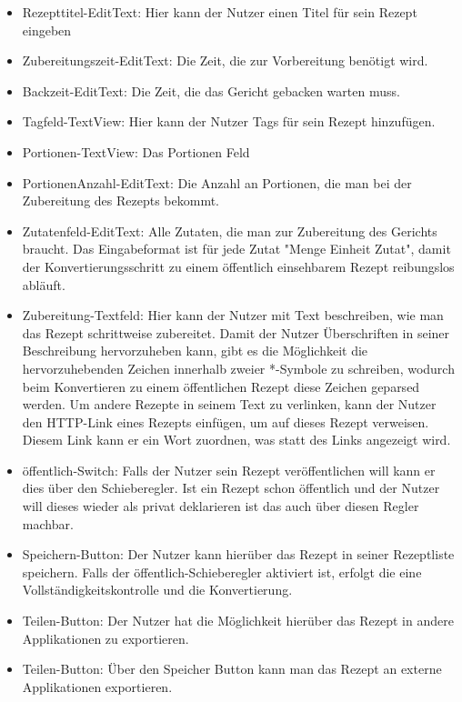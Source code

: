 \begin{itemize}[nosep]
	\item 	Rezepttitel-EditText: Hier kann der Nutzer einen Titel für sein Rezept eingeben 
	\item 	Zubereitungszeit-EditText: Die Zeit, die zur Vorbereitung benötigt wird.
	\item 	Backzeit-EditText: Die Zeit, die das Gericht gebacken warten muss.
	
	\item 	Tagfeld-TextView: Hier kann der Nutzer Tags für sein Rezept hinzufügen. 
	
	\item Portionen-TextView: Das Portionen Feld
	\item PortionenAnzahl-EditText: Die Anzahl an Portionen, die man bei der Zubereitung des Rezepts bekommt. 
	\item Zutatenfeld-EditText: Alle Zutaten, die man zur Zubereitung des Gerichts braucht. Das Eingabeformat ist für jede Zutat "Menge Einheit Zutat", damit der Konvertierungsschritt zu einem öffentlich einsehbarem Rezept reibungslos abläuft.
	\item 	Zubereitung-Textfeld: Hier kann der Nutzer mit Text beschreiben, wie man das Rezept schrittweise zubereitet. Damit der Nutzer Überschriften in seiner Beschreibung hervorzuheben kann, gibt es die Möglichkeit die hervorzuhebenden Zeichen innerhalb zweier *-Symbole zu schreiben, wodurch beim Konvertieren zu einem öffentlichen Rezept diese Zeichen geparsed werden. Um andere Rezepte in seinem Text zu verlinken, kann der Nutzer den HTTP-Link eines Rezepts einfügen, um auf dieses Rezept verweisen. Diesem Link kann er ein Wort zuordnen, was statt des Links angezeigt wird.
	
	\item 	öffentlich-Switch: Falls der Nutzer sein Rezept veröffentlichen will kann er dies über den Schieberegler. Ist ein Rezept schon öffentlich und der Nutzer will dieses wieder als privat deklarieren ist das auch über diesen Regler machbar.
	
	\item 	Speichern-Button: Der Nutzer kann hierüber das Rezept in seiner Rezeptliste speichern. Falls der öffentlich-Schieberegler aktiviert ist, erfolgt die eine Vollständigkeitskontrolle und die Konvertierung.
	\item Teilen-Button: Der Nutzer hat die Möglichkeit hierüber das Rezept in andere Applikationen zu exportieren.
	\item Teilen-Button: Über den Speicher Button kann man das Rezept an externe Applikationen exportieren.
\end{itemize}


